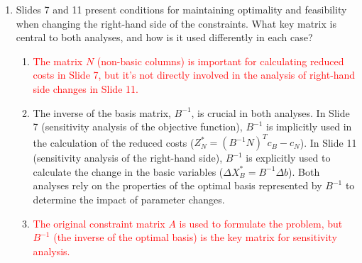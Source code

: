 \documentclass{article}%
\newcommand{\incorrect}[1]{\textcolor{red}{#1}}
\begin{document}
\begin{enumerate}
\begin{enumerate}
\item \incorrect{While the dual simplex method is a linear programming algorithm, it's not directly used here for sensitivity analysis of the objective function coefficients. The analysis is done using the information from the optimal simplex tableau.}%
\item Slides 2, 3, 5, 6, 9, and 10 show that the optimal solution is expressed in terms of non-basic variables.  The coefficients of these non-basic variables in the expression for the objective function are the reduced costs.  The condition for the current solution to remain optimal is that these reduced costs remain non-positive after any changes to the objective function coefficients.  Therefore, sensitivity analysis involves examining how changes in the objective function coefficients affect the reduced costs.%
\item \incorrect{This describes sensitivity analysis of the right-hand side of the constraints, not the objective function coefficients.}%
\item \incorrect{The graphical method is useful for small problems, but it's not the approach used in these slides for sensitivity analysis of the objective function coefficients.}%
\end{enumerate}%
\vspace{1em}%
\item Slides 7 and 11 present conditions for maintaining optimality and feasibility when changing the right-hand side of the constraints.  What key matrix is central to both analyses, and how is it used differently in each case?%
\begin{enumerate}%
\item \incorrect{The matrix $N$ (non-basic columns) is important for calculating reduced costs in Slide 7, but it's not directly involved in the analysis of right-hand side changes in Slide 11.}%
\item The inverse of the basis matrix, $B^{-1}$, is crucial in both analyses. In Slide 7 (sensitivity analysis of the objective function), $B^{-1}$ is implicitly used in the calculation of the reduced costs ($Z_N^* = (B^{-1}N)^T c_B - c_N$). In Slide 11 (sensitivity analysis of the right-hand side), $B^{-1}$ is explicitly used to calculate the change in the basic variables ($\Delta X_B^* = B^{-1} \Delta b$).  Both analyses rely on the properties of the optimal basis represented by $B^{-1}$ to determine the impact of parameter changes.%
\item \incorrect{The original constraint matrix $A$ is used to formulate the problem, but $B^{-1}$ (the inverse of the optimal basis) is the key matrix for sensitivity analysis.}%

\end{enumerate}
\end{enumerate}
\end{document}
